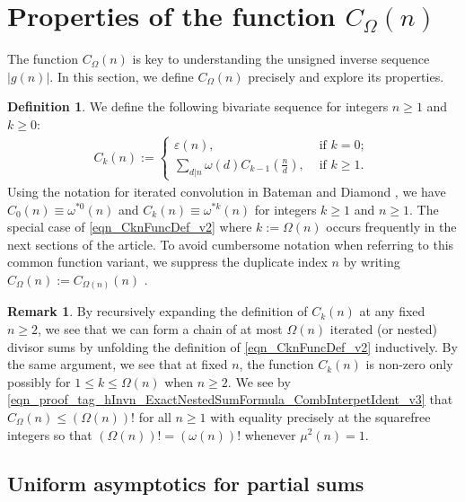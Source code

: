 \documentclass[11pt,reqno,a4letter]{article}
\numberwithin{equation}{section}
\numberwithin{figure}{section}
\numberwithin{table}{section}
\newcommand{\seqnum}[1]{\href{http://oeis.org/#1}{\color{ProcessBlue}{\underline{#1}}}}
\theoremstyle{plain}
\numberwithin{theorem}{section}
\theoremstyle{definition}
\newtheorem{remark}[theorem]{Remark}
\newtheorem{definition}[theorem]{Definition}
\begin{document}
\section{Properties of the function $C_{\Omega}(n)$} 
\label{Section_NewFormulasForgInvn_v1} 

The function $C_{\Omega}(n)$ is key to understanding the 
unsigned inverse sequence $|g(n)|$. In this section, we define $C_{\Omega}(n)$ 
precisely and explore its properties. 

\begin{definition}
We define the following bivariate sequence for integers $n \geq 1$ and $k \geq 0$: 
\begin{align} 
\label{eqn_CknFuncDef_v2} 
C_k(n) := \begin{cases} 
     \varepsilon(n), & \text{ if $k = 0$; } \\ 
     \sum\limits_{d|n} \omega(d) C_{k-1}\left(\frac{n}{d}\right), & \text{ if $k \geq 1$. } 
     \end{cases} 
\end{align} 
Using the notation for iterated convolution in 
Bateman and Diamond \cite[Def.~ 2.3; \S 2]{ANT-BATEMAN-DIAMOND}, we have 
$C_0(n) \equiv \omega^{\ast 0}(n)$ and $C_k(n) \equiv \omega^{\ast k}(n)$ for 
integers $k \geq 1$ and $n \geq 1$. 
The special case of \eqref{eqn_CknFuncDef_v2} where 
$k := \Omega(n)$ occurs frequently in the next sections of the 
article. To avoid cumbersome notation when referring to this common function variant, we suppress the 
duplicate index $n$ by writing $C_{\Omega}(n) := C_{\Omega(n)}(n)$ \cite[\seqnum{A008480}]{OEIS}. 
\end{definition}

\begin{remark}
By recursively expanding the definition of $C_k(n)$ 
at any fixed $n \geq 2$, we see that 
we can form a chain of at most $\Omega(n)$ iterated (or nested) divisor sums by 
unfolding the definition of \eqref{eqn_CknFuncDef_v2} inductively. 
By the same argument, we see that at fixed $n$, the function 
$C_k(n)$ is non-zero only possibly for 
$1 \leq k \leq \Omega(n)$ when $n \geq 2$. 
We see by 
\eqref{eqn_proof_tag_hInvn_ExactNestedSumFormula_CombInterpetIdent_v3} 
that $C_{\Omega}(n) \leq (\Omega(n))!$ for all $n \geq 1$ with 
equality precisely at the squarefree integers so that 
$(\Omega(n))! = (\omega(n))!$ whenever $\mu^2(n) = 1$. 
\end{remark}

\subsection{Uniform asymptotics for partial sums}
\label{subSection_Section4_AnalyticPrerequisiteProofsOfUniformBoundsOnCertainPartialSumTypes_v1} 
\end{document}
